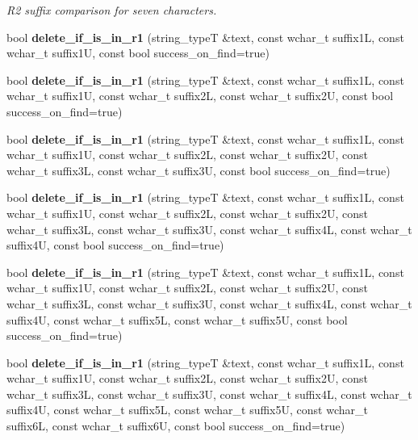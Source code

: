 \begin{DoxyCompactItemize}
\begin{DoxyCompactList}\small\item\em R2 suffix comparison for seven characters. \end{DoxyCompactList}\item 
bool {\bfseries delete\+\_\+if\+\_\+is\+\_\+in\+\_\+r1} (string\+\_\+typeT \&text, const wchar\+\_\+t suffix1L, const wchar\+\_\+t suffix1U, const bool success\+\_\+on\+\_\+find=true)\label{classstemming_1_1stem_a3bda630783eae1661f00fc5d2b51ce5c}

\item 
bool {\bfseries delete\+\_\+if\+\_\+is\+\_\+in\+\_\+r1} (string\+\_\+typeT \&text, const wchar\+\_\+t suffix1L, const wchar\+\_\+t suffix1U, const wchar\+\_\+t suffix2L, const wchar\+\_\+t suffix2U, const bool success\+\_\+on\+\_\+find=true)\label{classstemming_1_1stem_a843e54b874cbb56a5d5997987137c933}

\item 
bool {\bfseries delete\+\_\+if\+\_\+is\+\_\+in\+\_\+r1} (string\+\_\+typeT \&text, const wchar\+\_\+t suffix1L, const wchar\+\_\+t suffix1U, const wchar\+\_\+t suffix2L, const wchar\+\_\+t suffix2U, const wchar\+\_\+t suffix3L, const wchar\+\_\+t suffix3U, const bool success\+\_\+on\+\_\+find=true)\label{classstemming_1_1stem_af5c33c5c4644373cd85390c7e3282084}

\item 
bool {\bfseries delete\+\_\+if\+\_\+is\+\_\+in\+\_\+r1} (string\+\_\+typeT \&text, const wchar\+\_\+t suffix1L, const wchar\+\_\+t suffix1U, const wchar\+\_\+t suffix2L, const wchar\+\_\+t suffix2U, const wchar\+\_\+t suffix3L, const wchar\+\_\+t suffix3U, const wchar\+\_\+t suffix4L, const wchar\+\_\+t suffix4U, const bool success\+\_\+on\+\_\+find=true)\label{classstemming_1_1stem_a6be1595a7c29fec666ff808701be3eb2}

\item 
bool {\bfseries delete\+\_\+if\+\_\+is\+\_\+in\+\_\+r1} (string\+\_\+typeT \&text, const wchar\+\_\+t suffix1L, const wchar\+\_\+t suffix1U, const wchar\+\_\+t suffix2L, const wchar\+\_\+t suffix2U, const wchar\+\_\+t suffix3L, const wchar\+\_\+t suffix3U, const wchar\+\_\+t suffix4L, const wchar\+\_\+t suffix4U, const wchar\+\_\+t suffix5L, const wchar\+\_\+t suffix5U, const bool success\+\_\+on\+\_\+find=true)\label{classstemming_1_1stem_abac9ef13a80efee3dad9b72476f7cd49}

\item 
bool {\bfseries delete\+\_\+if\+\_\+is\+\_\+in\+\_\+r1} (string\+\_\+typeT \&text, const wchar\+\_\+t suffix1L, const wchar\+\_\+t suffix1U, const wchar\+\_\+t suffix2L, const wchar\+\_\+t suffix2U, const wchar\+\_\+t suffix3L, const wchar\+\_\+t suffix3U, const wchar\+\_\+t suffix4L, const wchar\+\_\+t suffix4U, const wchar\+\_\+t suffix5L, const wchar\+\_\+t suffix5U, const wchar\+\_\+t suffix6L, const wchar\+\_\+t suffix6U, const bool success\+\_\+on\+\_\+find=true)\label{classstemming_1_1stem_a3fbbd1cbf322889ba4e4940d87449bb0}


\end{DoxyCompactItemize}
